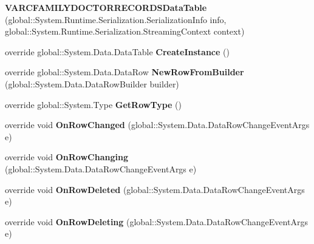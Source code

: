 \begin{CompactItemize}
\item 
\textbf{VARCFAMILYDOCTORRECORDSDataTable} (global::System.Runtime.Serialization.SerializationInfo info, global::System.Runtime.Serialization.StreamingContext context)\label{class_automatic_medical_system_1_1_data_set1_1_1_v_a_r_c_f_a_m_i_l_y_d_o_c_t_o_r_r_e_c_o_r_d_s_data_table_e1325de96e663af09b3ed7420915348f}

\item 
override global::System.Data.DataTable \textbf{CreateInstance} ()\label{class_automatic_medical_system_1_1_data_set1_1_1_v_a_r_c_f_a_m_i_l_y_d_o_c_t_o_r_r_e_c_o_r_d_s_data_table_f3d88091db86eba33f956b3c21728da1}

\item 
override global::System.Data.DataRow \textbf{NewRowFromBuilder} (global::System.Data.DataRowBuilder builder)\label{class_automatic_medical_system_1_1_data_set1_1_1_v_a_r_c_f_a_m_i_l_y_d_o_c_t_o_r_r_e_c_o_r_d_s_data_table_bedbffd275455a645741f3629833f09e}

\item 
override global::System.Type \textbf{GetRowType} ()\label{class_automatic_medical_system_1_1_data_set1_1_1_v_a_r_c_f_a_m_i_l_y_d_o_c_t_o_r_r_e_c_o_r_d_s_data_table_7ba68c443b52cd5cbf706d6ba588a19a}

\item 
override void \textbf{OnRowChanged} (global::System.Data.DataRowChangeEventArgs e)\label{class_automatic_medical_system_1_1_data_set1_1_1_v_a_r_c_f_a_m_i_l_y_d_o_c_t_o_r_r_e_c_o_r_d_s_data_table_bdb63362749171be9df4eb732ef50dbb}

\item 
override void \textbf{OnRowChanging} (global::System.Data.DataRowChangeEventArgs e)\label{class_automatic_medical_system_1_1_data_set1_1_1_v_a_r_c_f_a_m_i_l_y_d_o_c_t_o_r_r_e_c_o_r_d_s_data_table_bd697cc8b4b42973dfe55ee654c84e9f}

\item 
override void \textbf{OnRowDeleted} (global::System.Data.DataRowChangeEventArgs e)\label{class_automatic_medical_system_1_1_data_set1_1_1_v_a_r_c_f_a_m_i_l_y_d_o_c_t_o_r_r_e_c_o_r_d_s_data_table_b6b5029679a7b486aeab9b9cfd6a4f76}

\item 
override void \textbf{OnRowDeleting} (global::System.Data.DataRowChangeEventArgs e)\label{class_automatic_medical_system_1_1_data_set1_1_1_v_a_r_c_f_a_m_i_l_y_d_o_c_t_o_r_r_e_c_o_r_d_s_data_table_6c090503021e9275d89c22291bd8ccf5}

\end{CompactItemize}
